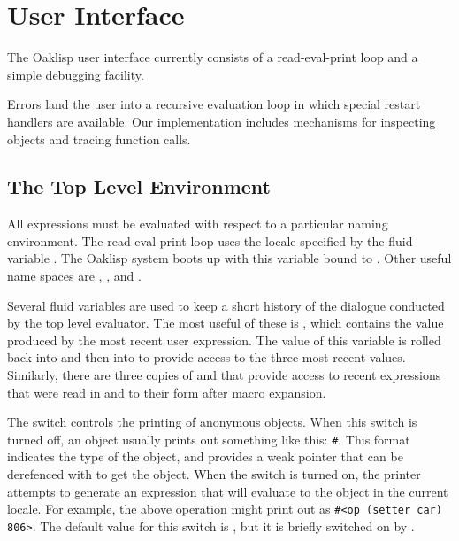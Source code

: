 %
%
%


\chapter{User Interface} \label{user}

The Oaklisp user interface currently consists of a read-eval-print
loop and a simple debugging facility.

Errors land the user into a recursive evaluation loop in which special
restart handlers are available.  Our implementation includes
mechanisms for inspecting objects and tracing function calls.


\section{The Top Level Environment}

All expressions must be evaluated with respect to a particular naming
environment.  The read-eval-print loop uses the locale specified by
the fluid variable .  The Oaklisp system boots up
with this variable bound to .  Other useful name
spaces are , , and
.

Several fluid variables are used to keep a short history of the
dialogue conducted by the top level evaluator.  The most useful of
these is \dffl{*}, which contains the value produced by the most
recent user expression.  The value of this variable is rolled back
into \dffl{**} and then into \dffl{***} to provide access to the three
most recent values.  Similarly, there are three copies of \dffl{+} and
 that provide access to recent expressions that were read in
and to their form after macro expansion.

The switch  controls the printing of anonymous
objects.  When this switch is turned off, an object usually prints out
something like this: \texttt{\#<op 806>}.  This format indicates the type
of the object, and provides a weak pointer that can be derefenced with
 to get the object.  When the
 switch is turned on, the printer attempts to
generate an expression that will evaluate to the object in the current
locale.  For example, the above operation might print out as \texttt{\#<op
(setter car) 806>}.  The default value for this switch is
, but it is briefly switched on by .

